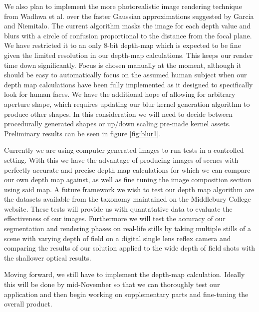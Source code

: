 \documentclass[12pt]{article}
\begin{document}
We also plan to implement the more photorealistic image rendering technique from Wadhwa et al. \autocite{Wadhwa2018}  over the faster Gaussian approximations suggested by Garcia\autocite{Garcia2017} and Niemitalo.\autocite{Niemitalo2010} The current algorithm masks the image for each depth value and blurs with a circle of confusion proportional to the distance from the focal plane. We have restricted it to an only 8-bit depth-map which is expected to be fine given the limited resolution in our depth-map calculations. This keeps our render time down significantly. Focus is chosen manually at the moment, although it should be easy to automatically focus on the assumed human subject when our depth map calculations have been fully implemented as it designed to specifically look for human faces. We have the additional hope of allowing for arbitrary aperture shape, which requires updating our blur kernel generation algorithm to produce other shapes. In this consideration we will need to decide between procedurally generated shapes or up/down scaling pre-made kernel assets. Preliminary results can be seen in figure \ref{fig:blur1}.

Currently we are using computer generated images to run tests in a controlled setting. With this we have the advantage of producing images of scenes with perfectly accurate and precise depth map calculations for which we can compare our own depth map against, as well as fine tuning the image composition section using said map. A future framework we wish to test our depth map algorithm are the datasets available from the taxonomy maintained on the Middlebury College website.\autocite{Scharstein2002}\autocite{Scharstein2003}\autocite{Scharstein2007}\autocite{Scharstein2014}\autocite{Hirschmuller2007} These tests will provide us with quantatative data to evaluate the effectiveness of our images. Furthermore we will test the accuracy of our segmentation and rendering phases on real-life stills by taking multiple stills of a scene with varying depth of field on a digital single lens reflex camera and comparing the results of our solution applied to the wide depth of field shots with the shallower optical results. 

Moving forward, we still have to implement the depth-map calculation. Ideally this will be done by mid-November so that we can thoroughly test our application and then begin working on supplementary parts and fine-tuning the overall product. 
\end{document}
